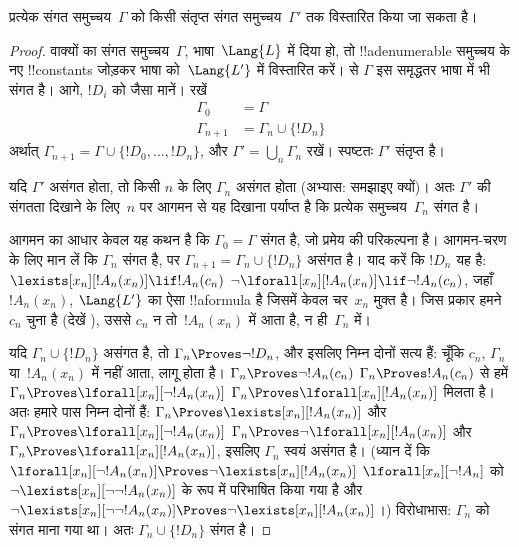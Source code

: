 \documentclass[../../../include/open-logic-section]{subfiles}
\begin{document}
\begin{lem}
प्रत्येक संगत समुच्चय~$\Gamma$ को किसी संतृप्त संगत समुच्चय~$\Gamma'$ तक
विस्तारित किया जा सकता है।
\end{lem}

\begin{proof}
वाक्यों का संगत समुच्चय~$\Gamma$, भाषा~$\Lang{L}$ में दिया हो, तो
!!a{denumerable} समुच्चय के नए !!{constant}s जोड़कर भाषा को~$\Lang{L'}$ में
विस्तारित करें।  से $\Gamma$ इस समृद्धतर भाषा में भी
संगत है। आगे, $!D_i$ को  जैसा मानें। रखें
\begin{align*}
\Gamma_0 & = \Gamma \\
\Gamma_{n+1} & = \Gamma_n \cup \{!D_n \}
\end{align*}
अर्थात् $\Gamma_{n+1} = \Gamma \cup \{ !D_0, \dots, !D_n \}$, और
$\Gamma' = \bigcup_{n} \Gamma_n$ रखें। स्पष्टतः $\Gamma'$ संतृप्त है।

यदि $\Gamma'$ असंगत होता, तो किसी $n$ के लिए $\Gamma_n$ असंगत होता
(अभ्यास: समझाइए क्यों)। अतः $\Gamma'$ की संगतता दिखाने के लिए~$n$ पर आगमन
से यह दिखाना पर्याप्त है कि प्रत्येक समुच्चय~$\Gamma_n$ संगत है।

आगमन का आधार केवल यह कथन है कि $\Gamma_0 = \Gamma$ संगत है, जो प्रमेय की
परिकल्पना है। आगमन-चरण के लिए मान लें कि $\Gamma_{n}$ संगत है, पर
$\Gamma_{n+1} =
\Gamma_n \cup \{!D_n\}$ असंगत है। याद करें कि $!D_n$ यह है:
{$\lexists[x_{n}][!A_{n}(x_n)] \lif !A_{n}(c_{n})$}
{$\lnot\lforall[x_{n}][!A_{n}(x_n)] \lif \lnot !A_{n}(c_{n})$},
जहाँ $!A_n(x_n)$, $\Lang{L'}$ का ऐसा !!a{formula} है जिसमें केवल
चर~$x_n$ मुक्त है। जिस प्रकार हमने~$c_n$ चुना है (देखें
), उससे $c_n$ न तो~$!A_n(x_n)$ में आता है, न
ही~$\Gamma_n$ में।

यदि $\Gamma_n \cup \{!D_n\}$ असंगत है, तो $\Gamma_n
\Proves \lnot !D_n$, और इसलिए निम्न दोनों सत्य हैं:
चूँकि $c_n$, $\Gamma_n$ या~$!A_n(x_n)$ में नहीं आता,
 लागू होता है।
{$\Gamma_n \Proves \lnot !A_n(c_n)$}
{$\Gamma_n \Proves !A_n(c_n)$}
से हमें
{$\Gamma_n \Proves \lforall[x_n][\lnot !A_n(x_n)]$}
{$\Gamma_n \Proves \lforall[x_n][!A_n(x_n)]$}
मिलता है। अतः हमारे पास निम्न दोनों हैं:
{$\Gamma_n \Proves \lexists[x_n][!A_n(x_n)]$ और
$\Gamma_n \Proves \lforall[x_n][\lnot !A_n(x_n)]$}
{$\Gamma_n \Proves \lnot\lforall[x_n][!A_n(x_n)]$ और
$\Gamma_n \Proves \lforall[x_n][!A_n(x_n)]$},
इसलिए $\Gamma_n$ स्वयं असंगत है।
{(ध्यान दें कि
{$\lforall[x_n][\lnot !A_n(x_n)] \Proves
  \lnot\lexists[x_n][!A_n(x_n)]$}
{$\lforall[x_n][\lnot !A_n]$ को
  $\lnot\lexists[x_n][\lnot\lnot !A_n(x_n)]$ के रूप में परिभाषित किया गया
  है और $\lnot\lexists[x_n][\lnot\lnot !A_n(x_n)] \Proves
  \lnot\lexists[x_n][!A_n(x_n)]$}।)}{}
विरोधाभास: $\Gamma_n$ को संगत माना गया था। अतः
$\Gamma_n \cup \{ !D_n\}$ संगत है।
\end{proof}
\end{document}
